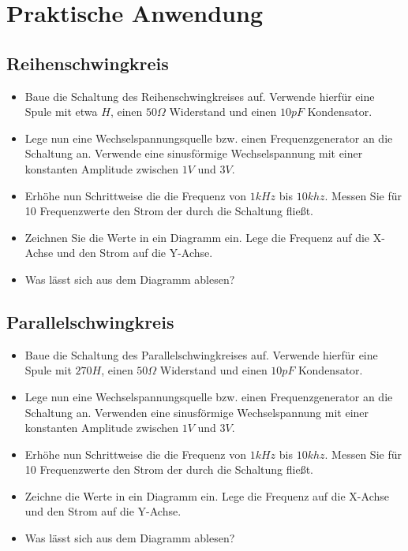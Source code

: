 \section{Praktische Anwendung}

\subsection*{Reihenschwingkreis}

\begin{itemize}
\itemsep1pt\parskip0pt
\item Baue die Schaltung des Reihenschwingkreises auf. Verwende hierfür eine Spule mit etwa $H$, einen $50\Omega$ Widerstand und einen $10pF$ Kondensator. 
\item Lege nun eine Wechselspannungsquelle bzw. einen Frequenzgenerator an die Schaltung an. Verwende eine sinusförmige Wechselspannung mit einer konstanten Amplitude zwischen $1V$ und $3V$.
\item Erhöhe nun Schrittweise die die Frequenz von $1kHz$ bis $10khz$. Messen Sie für 10 Frequenzwerte den Strom der durch die Schaltung fließt.
\item Zeichnen Sie die Werte in ein Diagramm ein. Lege die Frequenz auf die X-Achse und den Strom auf die Y-Achse.
\item Was lässt sich aus dem Diagramm ablesen?
\end{itemize}


\subsection*{Parallelschwingkreis}

\begin{itemize}
\itemsep1pt\parskip0pt
\item Baue die Schaltung des Parallelschwingkreises auf. Verwende hierfür eine Spule mit $270H$, einen $50\Omega$ Widerstand und einen $10pF$ Kondensator. 
\item Lege nun eine Wechselspannungsquelle bzw. einen Frequenzgenerator an die Schaltung an. Verwenden eine sinusförmige Wechselspannung mit einer konstanten Amplitude zwischen $1V$ und $3V$.
\item Erhöhe nun Schrittweise die die Frequenz von $1kHz$ bis $10khz$. Messen Sie für 10 Frequenzwerte den Strom der durch die Schaltung fließt.
\item Zeichne die Werte in ein Diagramm ein. Lege die Frequenz auf die X-Achse und den Strom auf die Y-Achse.
\item Was lässt sich aus dem Diagramm ablesen?
\end{itemize}

